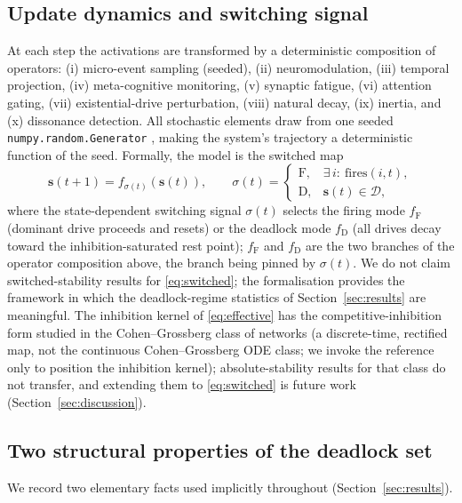\documentclass[journal]{IEEEtran}
\newcommand{\DD}{\mathcal{D}}
\newcommand{\bs}{\mathbf{s}}
\begin{document}
\subsection{Update dynamics and switching signal}
At each step the activations are transformed by a deterministic
composition of operators: (i) micro-event sampling
(seeded), (ii) neuromodulation, (iii) temporal projection, (iv)
meta-cognitive monitoring, (v) synaptic fatigue, (vi) attention gating,
(vii) existential-drive perturbation, (viii) natural decay, (ix) inertia,
and (x) dissonance detection. All stochastic elements draw from one
seeded \texttt{numpy.random.Generator} \cite{harris2020}, making the
system's trajectory a deterministic function of the seed. Formally, the
model is the switched map
\begin{equation}
\label{eq:switched}
\bs(t{+}1)=f_{\sigma(t)}(\bs(t)),\qquad
\sigma(t)=\begin{cases}
\mathrm{F}, & \exists\, i:\ \mathrm{fires}(i,t),\\
\mathrm{D}, & \bs(t)\in\DD,
\end{cases}
\end{equation}
where the state-dependent switching signal $\sigma(t)$ selects the
firing mode $f_{\mathrm{F}}$ (dominant drive proceeds and resets) or the
deadlock mode $f_{\mathrm{D}}$ (all drives decay toward the
inhibition-saturated rest point); $f_{\mathrm{F}}$ and $f_{\mathrm{D}}$
are the two branches of the operator composition above, the branch being
pinned by $\sigma(t)$. We do not claim switched-stability results for
\eqref{eq:switched}; the formalisation provides the framework in which
the deadlock-regime statistics of Section~\ref{sec:results} are
meaningful. The inhibition kernel of \eqref{eq:effective} has the
competitive-inhibition form studied in the Cohen--Grossberg class of
networks \cite{cohengrossberg1983} (a discrete-time, rectified map,
not the continuous Cohen--Grossberg ODE class; we invoke the reference
only to position the inhibition kernel); absolute-stability results for
that class do not transfer, and extending them to \eqref{eq:switched}
is future work (Section~\ref{sec:discussion}).

\subsection*{Two structural properties of the deadlock set}
We record two elementary facts used implicitly throughout
(Section~\ref{sec:results}).
\end{document}
